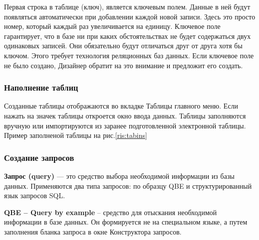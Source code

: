 \documentclass[a4paper]{article}
\begin{document}
Первая строка в таблице (ключ), является ключевым полем. Данные в ней будут появляться автоматически при добавлении каждой новой записи. Здесь это просто номер, который каждый раз увеличивается на единицу. Ключевое поле гарантирует, что в базе ни при каких обстоятельствах не будет содержаться двух одинаковых записей. Они обязательно будут отличаться друг от друга хотя бы ключом. Этого требует технология реляционных баз данных. Если ключевое поле не было создано, Дизайнер обратит на это внимание и предложит его создать.

\subsubsection{Наполнение таблиц}

Созданные таблицы отображаются во вкладке Таблицы главного меню. Если нажать на значек таблицы откроется окно ввода данных. Таблицы заполняются вручную или импортируются из заранее подготовленной электронной таблицы. Пример заполненой таблицы на рис.\ref{ris:tabins}

\begin{figure}[h]
\end{figure}

\subsubsection{Создание запросов}

\textbf{Запрос (query)} --- это средство выбора необходимой информации из базы данных. Применяются два типа запросов: по образцу QBE и структурированный язык запросов SQL.

\textbf{QBE – Query by example} – средство для отыскания необходимой информации в базе данных. Он формируется не на специальном языке, а путем заполнения бланка запроса в окне Конструктора запросов.
\end{document}
